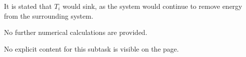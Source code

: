 It is stated that \( T_i \) would sink, as the system would continue to remove energy from the surrounding system.  

No further numerical calculations are provided.

No explicit content for this subtask is visible on the page.